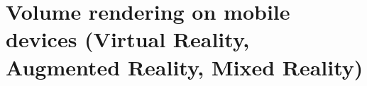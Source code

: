 \chapter{Volume rendering on mobile devices (Virtual Reality, Augmented Reality, Mixed Reality) }
\label{mixedReality}


